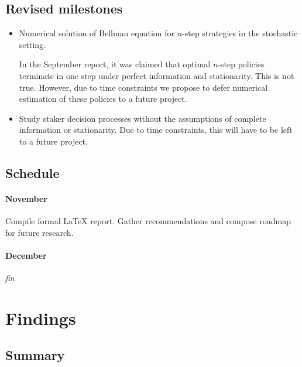 \subsection*{Revised milestones}

\begin{itemize}
  \item Numerical solution of Bellman equation for $n$-step strategies in the stochastic setting. 
  
  In the September report, it was claimed that optimal $n$-step policies terminate in one step under perfect information and stationarity.
  This is not true.
  However, due to time constraints we propose to defer numerical estimation of these policies to a future project.

  
  \item Study staker decision processes without the assumptions of complete information or stationarity. Due to time constraints, this will have to be left to a future project.

\end{itemize}


\subsection*{Schedule}

\paragraph{November} Compile formal LaTeX report. Gather recommendations and compose roadmap for future research.

\paragraph{December} \emph{fin}



\section*{Findings}

\subsection*{Summary}

